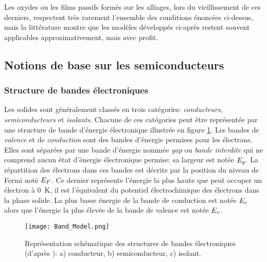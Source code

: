 \begin{refsection}
    Les oxydes ou les films passifs formés sur les alliages, lors du vieillissement de ces derniers, respectent très
    rarement l'ensemble des conditions énoncées ci-dessus, mais la littérature montre que les modèles développés ci-après
    restent souvent applicables approximativement, mais avec profit.


    \subsection{Notions de base sur les semiconducteurs}\label{subsec:basics_semiconductors}
    
    \subsubsection{Structure de bandes électroniques}\label{subsubsec:band_model}

    Les solides sont généralement classés en trois catégories: \emph{conducteurs}, \emph{semiconducteurs} et
    \emph{isolants}.
    Chacune de ces catégories peut être représentée par une structure de bande d'énergie électronique illustrée en figure
    \ref{fig:band_model}. Les bandes de \emph{valence} et de \emph{conduction} sont des bandes d'énergie permises pour les
    électrons. Elles sont séparées par une bande d'énergie nommée \emph{gap} ou \emph{bande interdite} qui ne
    comprend aucun état d'énergie électronique permise: sa largeur est notée $E_g$. La répartition des électrons dans
    ces
    bandes est décrite par la position du niveau de Fermi noté $E_F$. Ce dernier représente l'énergie la plus haute que peut occuper
    un électron à \SI{0}{\kelvin}, il est l'équivalent du potentiel électrochimique des électrons dans la phase solide. 
    La plus basse énergie de la bande de conduction est notée $E_c$ alors que l'énergie
    la plus élevée de la bande de valence est notée $E_v$.

     \begin{figure}[H]
        \centering
        \texttt{[image: Band\_Model.png]}
        \caption[Représentation schématique des structures de bandes électroniques:
        a) conducteur, 
        b) semiconducteur,
        c) isolant.]
        {Représentation schématique des structures de bandes électroniques (d'après \citet{Marucco2006}):
        a) conducteur, 
        b) semiconducteur,
        c) isolant.}
        \label{fig:band_model}
    \end{figure}


\end{refsection}
